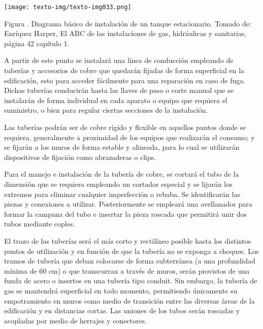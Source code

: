 \documentclass{article}
\newcounter{Figura}
\renewcommand\theFigura{\arabic{Figura}}
\begin{document}
 \texttt{[image: texto-img/texto-img033.png]} 

Figura \stepcounter{Figura}{\theFigura}. Diagrama básico de instalación de un tanque estacionario. \newline
Tomado de: Enríquez Harper, El ABC de las instalaciones de gas, hidráulicas y sanitarias, página 42 capítulo 1.


\bigskip


\bigskip

A partir de este punto se instalará una línea de conducción empleando de tuberías y accesorios de cobre que quedarán fijadas de forma superficial en la edificación, esto para acceder fácilmente para una reparación en caso de fuga. Dichas tuberías conducirán hasta las llaves de paso o corte manual que se instalarán de forma individual en cada aparato o equipo que requiera el suministro, o bien para regular ciertas secciones de la instalación.


\bigskip

Las tuberías podrán ser de cobre rígido y flexible en aquellos puntos donde se requiera, generalmente a proximidad de los equipos que realizarán el consumo; y se fijarán a los muros de forma estable y alineada, para lo cual se utilizarán dispositivos de fijación como abrazaderas o clips. 


\bigskip

Para el manejo e instalación de la tubería de cobre, se cortará el tubo de la dimensión que se requiera empleando un cortador especial y se lijarán los extremos para eliminar cualquier imperfección o rebaba. Se identificarán las piezas y conexiones a utilizar. Posteriormente se empleará una avellanador para formar la campana del tubo e insertar la pieza roscada que permitirá unir dos tubos mediante coples.


\bigskip

El trazo de las tuberías será el más corto y rectilíneo posible hasta los distintos puntos de utilización y en función de que la tubería no se exponga a choques. Los tramos de tubería que deban colocarse de forma subterránea (a una profundidad mínima de 60 cm) o que transcurran a través de muros, serán provistos de una funda de acero o insertos en una tubería tipo conduit. Sin embargo, la tubería de gas se mantendrá superficial en todo momento, permitiendo únicamente su empotramiento en muros como medio de transición entre las diversas áreas de la edificación y en distancias cortas. Las uniones de los tubos serán roscadas y acopladas por medio de herrajes y conectores. 
\end{document}
